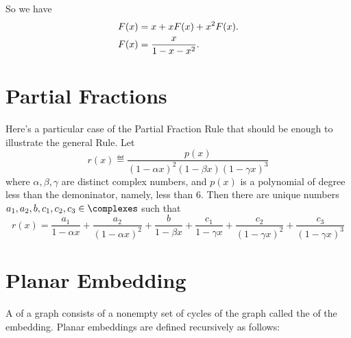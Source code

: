 \documentclass[handout]{mcs}
\begin{document}
So we have
\begin{align}
F(x) & = x + x F(x) + x^2 F(x). \notag\\
F(x) & = \frac{x}{1 - x - x^2}.\label{Fx}
\end{align}

\section{Partial Fractions}

Here's a particular case of the Partial Fraction Rule that should be
enough to illustrate the general Rule.  Let
\[
r(x) \eqdef \frac{p(x)}{(1-\alpha x)^2 (1-\beta x) (1-\gamma x)^3}
\]
where $\alpha, \beta, \gamma$ are distinct complex numbers, and $p(x)$ is
a polynomial of degree less than the demoninator, namely, less than 6.
Then there are unique numbers $a_1,a_2,b,c_1,c_2,c_3 \in \complexes$ such
that
\[
r(x)
= \frac{a_1}{1-\alpha x} + \frac{a_2}{(1-\alpha x)^2}
+ \frac{b}{1-\beta x}
+ \frac{c_1}{1-\gamma x} + \frac{c_2}{(1-\gamma x)^2} + \frac{c_3}{(1-\gamma x)^3}
\]

\section{Planar Embedding}

  A  of a  graph consists of a
  nonempty set of cycles of the graph called the 
  of the embedding.  Planar embeddings are defined recursively as
  follows:
\end{document}
